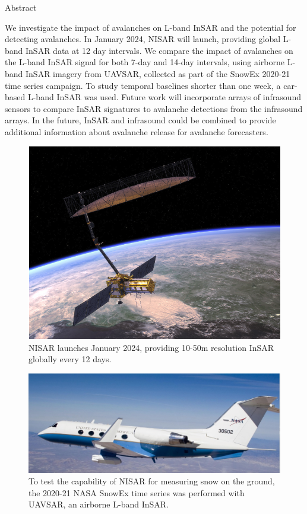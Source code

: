 \documentclass[landscape,a0b,final]{a0poster}
\newenvironment{sectionbox}[1]		%
{
\par 
\flushleft
\colorbox{boxcol}{ 				%
\sffamily\Large \color{white} #1                %
\hspace{0.5cm}}
\par\nobreak 
\nointerlineskip 				%
\setlength\parskip{-1pt}			%
\begin{lrbox}\envbox				%
\begin{minipage}{0.9\columnwidth}		%
}
{\par
\end{minipage}\end{lrbox}			%
\fcolorbox{boxcol}{fillcol}{\usebox\envbox}	%
\vspace{1cm}					%
}
\newenvironment{poster}{
  \begin{center}
    \begin{minipage}[c]{0.98\textwidth}
    }{
    \end{minipage} 
  \end{center}
}
\begin{document}
\begin{poster}
\thispagestyle{empty}
\begin{multicols}{4}		%

  
\begin{sectionbox}{Abstract}
\normalsize{We investigate the impact of avalanches on L-band InSAR and the potential for detecting avalanches.  In January 2024, NISAR will launch, providing global L-band InSAR data at 12 day intervals.  We compare the impact of avalanches on the L-band InSAR signal for both 7-day and 14-day intervals, using airborne L-band InSAR imagery from UAVSAR, collected as part of the SnowEx 2020-21 time series campaign.  To study temporal baselines shorter than one week, a car-based L-band InSAR was used.  Future work will incorporate arrays of infrasound sensors to compare InSAR signatures to avalanche detections from the infrasound arrays.  In the future, InSAR and infrasound could be combined to provide additional information about avalanche release for avalanche forecasters.}

\end{sectionbox}

\begin{figure}
\centering
\includegraphics[width=0.8\columnwidth]{FIGURES2/NISAR.png}
\caption{NISAR launches January 2024, providing 10-50m resolution InSAR globally every 12 days.}
\label{fig:ProfileTrace} 
\end{figure}

\begin{figure}
\centering
\includegraphics[width=0.8\columnwidth]{FIGURES2/UAVSAR.png}
\caption{To test the capability of NISAR for measuring snow on the ground, the 2020-21 NASA SnowEx time series was performed with UAVSAR, an airborne L-band InSAR.}
\label{fig:ProfileTrace} 
\end{figure}



\end{multicols}
\end{poster}
\end{document}
